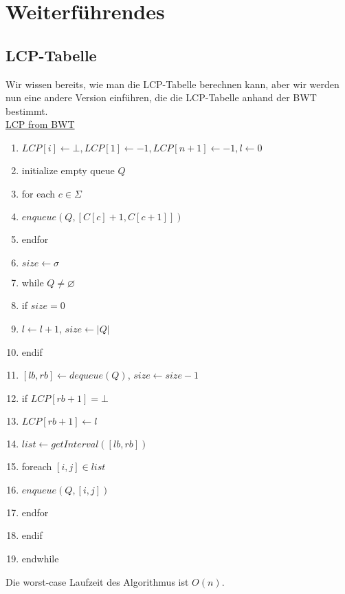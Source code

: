 \documentclass[a4paper, 12pt]{article}
\theoremstyle{plain}
\theoremstyle{definition}
\theoremstyle{lemma}
\theoremstyle{remark}
\theoremstyle{corollary}
\theoremstyle{example}
\begin{document}
	\section{Weiterführendes}
	\subsection{LCP-Tabelle}
	Wir wissen bereits, wie man die LCP-Tabelle berechnen kann, aber wir werden nun eine andere Version einführen, die die LCP-Tabelle anhand der BWT bestimmt.\\
	\underline{LCP from BWT}
	\begin{enumerate}
		\item $LCP[i]\gets \bot, LCP[1]\gets -1, LCP[n+1]\gets -1, l \gets 0$
		\item initialize empty queue $Q$
		\item for each $c \in \Sigma$
		\item $enqueue(Q,[C[c]+1,C[c+1]])$
		\item endfor 
		\item $size \gets \sigma$
		\item while $Q\neq \varnothing$
		\item if $size = 0$
		\item $l\gets l+1$, $size \gets \left|Q\right|$
		\item endif
		\item $[lb,rb] \gets dequeue(Q)$, $size \gets size-1$
		\item if $LCP[rb+1] = \bot$
		\item $LCP[rb+1] \gets l$
		\item $list \gets getInterval([lb,rb])$
		\item foreach $[i,j] \in list$
		\item $enqueue(Q,[i,j])$
		\item endfor
		\item endif 
		\item endwhile
	\end{enumerate}
	Die worst-case Laufzeit des Algorithmus ist $O(n)$.
\end{document}
